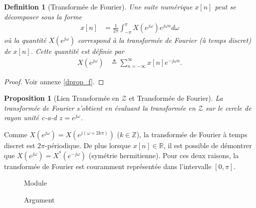 \documentclass[11pt,a4paper]{IEEEtran}
\newtheorem{proposition}{Proposition}
\newtheorem{definition}{Definition}
\begin{document}
\begin{definition}[Transformée de Fourier]
\label{prop_f}
Une suite numérique $x[n]$ peut se décomposer sous la forme 
\begin{align}
x[n]&= \frac{1}{2\pi}\int_{-\pi}^{\pi} X(e^{j\omega})e^{j\omega n}d\omega \label{e_def_if}
\end{align}
où la quantité $X(e^{j\omega})$ correspond à la transformée de Fourier (à temps discret) de $x[n]$. Cette quantité est définie par
\begin{align}
X(e^{j\omega})&\triangleq \sum_{n=-\infty}^{\infty}x[n]e^{-j\omega n}.
\end{align}
\end{definition}
\begin{proof}
Voir annexe \ref{dprop_f}.
\end{proof}

\begin{proposition}[Lien Transformée en $\mathcal{Z}$ et Transformée de Fourier]
La transformée de Fourier s'obtient en évaluant la transformée en $\mathcal{Z}$ sur le cercle de rayon unité c-a-d $z=e^{j\omega}$.
\end{proposition}


Comme $X(e^{j\omega})=X(e^{j(\omega+2k\pi)})$ ($k \in \mathbb{Z}$), la transformée de Fourier à temps discret est $2\pi$-périodique. De plus lorsque $x[n]\in \mathbb{R}$, il est possible de démontrer que $X(e^{j\omega})=X^{*}(e^{-j\omega})$ (symétrie hermitienne). Pour ces deux raisons, la transformée de Fourier est couramment représentée dans l'intervalle $[0,\pi]$.



\begin{figure*}[t]
\begin{subfigure}[b]{0.5\textwidth}
\centering
{}
\caption{Module}
\label{fig_f_abs}
\end{subfigure}%
\begin{subfigure}[b]{0.5\textwidth}
\centering
{}
\caption{Argument }
\end{subfigure}
\caption{Réponse fréquentielle (filtre 1).}
\label{fig_z2f}
\end{figure*}
\end{document}
